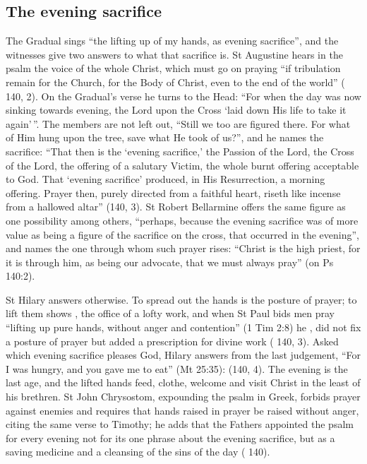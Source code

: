 \subsection{The evening sacrifice}

The Gradual sings ``the lifting up of my hands, as evening sacrifice'', and the
witnesses give two answers to what that sacrifice is. St Augustine hears in the
psalm the voice of the whole Christ, which must go on praying ``if tribulation
remain for the Church, for the Body of Christ, even to the end of the world''
( 140, 2). On the Gradual's verse he turns to the Head: ``For
when the day was now sinking towards evening, the Lord upon the Cross `laid down
His life to take it again'\,''. The members are not left out, ``Still we too are
figured there. For what of Him hung upon the tree, save what He took of us?'',
and he names the sacrifice: ``That then is the `evening sacrifice,' the Passion
of the Lord, the Cross of the Lord, the offering of a salutary Victim, the whole
burnt offering acceptable to God. That `evening sacrifice' produced, in His
Resurrection, a morning offering. Prayer then, purely directed from a faithful
heart, riseth like incense from a hallowed altar'' (140, 3). St Robert
Bellarmine offers the same figure as one possibility among others, ``perhaps,
because the evening sacrifice was of more value as being a figure of the
sacrifice on the cross, that occurred in the evening'', and names the one
through whom such prayer rises: ``Christ is the high priest, for it is through
him, as being our advocate, that we must always pray'' (on Ps 140:2).

St Hilary answers otherwise. To spread out the hands is the posture of prayer;
to lift them shows , the office of a lofty work,
and when St Paul bids men pray ``lifting up pure hands, without anger and
contention'' (1 Tim 2:8) he , did not fix a posture of prayer but
added a prescription for divine work ( 140, 3).
Asked which evening sacrifice pleases God, Hilary answers from the last
judgement,
``For I was hungry, and you gave me to eat'' (Mt 25:35):  (140, 4). The evening is
the last age, and the lifted hands feed, clothe, welcome and visit Christ in the
least of his brethren. St John Chrysostom, expounding the psalm in Greek, forbids
prayer against enemies and requires that hands raised in prayer be raised
without anger, citing the same verse to Timothy; he adds that the Fathers
appointed the psalm for every evening not for its one phrase about the evening
sacrifice, but as a saving medicine and a cleansing of the sins of the day
( 140).

